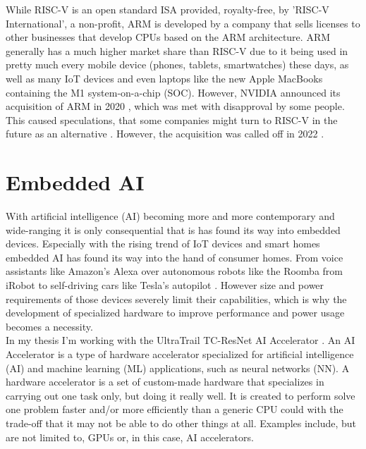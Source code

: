 While RISC-V \cite{riscv} is an open standard ISA provided, royalty-free, by 'RISC-V International', a non-profit,
ARM \cite{arm} is developed by a company that sells licenses to other businesses that develop CPUs based on the ARM architecture.
ARM generally has a much higher market share than RISC-V due to it being used in pretty much every mobile device (phones, tablets, smartwatches)
these days, as well as many IoT devices and even laptops like the new Apple MacBooks containing the M1 system-on-a-chip (SOC).
However, NVIDIA announced its acquisition of ARM in 2020 \cite{arm_sale}, which was met with disapproval by some people.
This caused speculations, that some companies might turn to RISC-V in the future as an alternative \cite{arm_sale_speculation}.
However, the acquisition was called off in 2022 \cite{arm_sale_called_off}.


\section{Embedded AI}

With artificial intelligence (AI) becoming more and more contemporary and wide-ranging it is only consequential that is has found its way into embedded devices.
Especially with the rising trend of IoT devices and smart homes embedded AI has found its way into the hand of consumer homes.
From voice assistants like Amazon's Alexa \cite{alexa} over autonomous robots like the Roomba \cite{roomba} from iRobot to self-driving cars like Tesla's autopilot \cite{autopilot}.
However size and power requirements of those devices severely limit their capabilities, which is why the development of specialized hardware to improve performance
and power usage becomes a necessity.\\

In my thesis I'm working with the UltraTrail TC-ResNet AI Accelerator \cite{ultratrail}.
An AI Accelerator is a type of hardware accelerator specialized for artificial intelligence (AI) and machine learning (ML) applications, such as neural networks (NN).
A hardware accelerator is a set of custom-made hardware that specializes in carrying out one task only, but doing it really well.
It is created to perform solve one problem faster and/or more efficiently than a generic CPU could with the trade-off that it may not be able to do other things at all.
Examples include, but are not limited to, GPUs or, in this case, AI accelerators.\\\\


